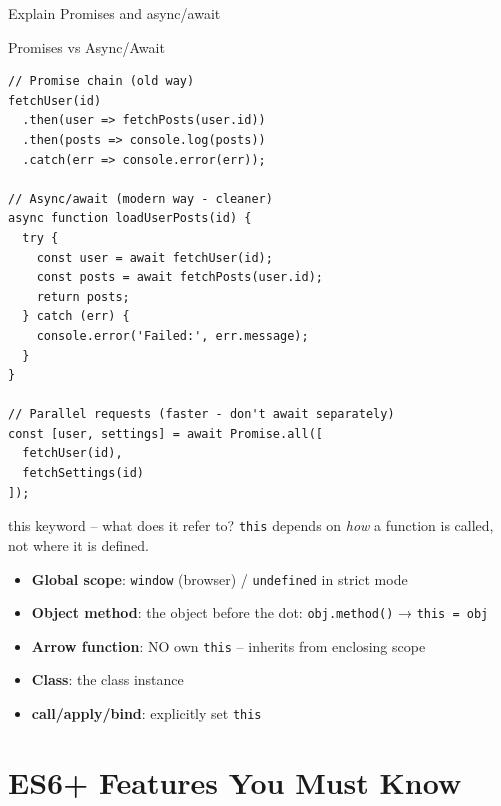 \documentclass[12pt,a4paper]{article}
\begin{document}
\begin{qbox}{Explain Promises and async/await}
\begin{codebox}{Promises vs Async/Await}
\begin{lstlisting}
// Promise chain (old way)
fetchUser(id)
  .then(user => fetchPosts(user.id))
  .then(posts => console.log(posts))
  .catch(err => console.error(err));

// Async/await (modern way - cleaner)
async function loadUserPosts(id) {
  try {
    const user = await fetchUser(id);
    const posts = await fetchPosts(user.id);
    return posts;
  } catch (err) {
    console.error('Failed:', err.message);
  }
}

// Parallel requests (faster - don't await separately)
const [user, settings] = await Promise.all([
  fetchUser(id),
  fetchSettings(id)
]);
\end{lstlisting}
\end{codebox}
\end{qbox}

\begin{qbox}{this keyword -- what does it refer to?}
\texttt{this} depends on \textit{how} a function is called, not where it is defined.
\begin{itemize}[leftmargin=1.5em, itemsep=4pt]
    \item \textbf{Global scope}: \texttt{window} (browser) / \texttt{undefined} in strict mode
    \item \textbf{Object method}: the object before the dot: \texttt{obj.method()} → \texttt{this = obj}
    \item \textbf{Arrow function}: NO own \texttt{this} -- inherits from enclosing scope
    \item \textbf{Class}: the class instance
    \item \textbf{call/apply/bind}: explicitly set \texttt{this}
\end{itemize}
\end{qbox}

\newpage

\section{ES6+ Features You Must Know}
\end{document}
